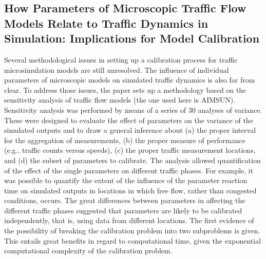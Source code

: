 \documentclass{article}
\begin{document}
\subsection*{How Parameters of Microscopic Traffic Flow Models Relate to Traffic Dynamics in Simulation: Implications for Model Calibration \cite{paramsCalib}
}
Several methodological issues in setting up a calibration process for traffic microsimulation models are still unresolved. The influence of individual parameters of microscopic models on simulated traffic dynamics is also far from clear. To address those issues, the paper sets up a methodology based on the sensitivity analysis of traffic flow models (the one used here is AIMSUN). Sensitivity analysis was performed by means of a series of 30 analyses of variance. These were designed to evaluate the effect of parameters on the variance of the simulated outputs and to draw a general inference about (a) the proper interval for the aggregation of measurements, (b) the proper measure of performance (e.g., traffic counts versus speeds), (c) the proper traffic measurement locations, and (d) the subset of parameters to calibrate. The analysis allowed quantification of the effect of the single parameters on different traffic phases. For example, it was possible to quantify the extent of the influence of the parameter reaction time on simulated outputs in locations in which free flow, rather than congested conditions, occurs. The great differences between parameters in affecting the different traffic phases suggested that parameters are likely to be calibrated independently, that is, using data from different locations. The first evidence of the possibility of breaking the calibration problem into two subproblems is given. This entails great benefits in regard to computational time, given the exponential computational complexity of the calibration problem.
\end{document}
